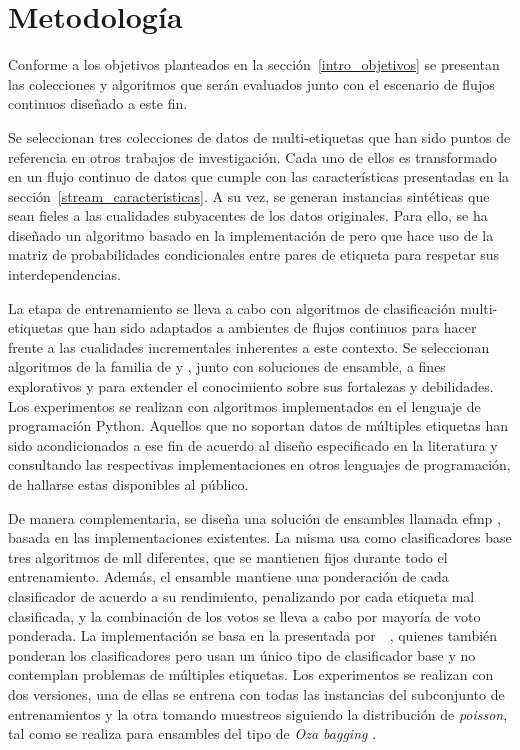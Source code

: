 \chapter{Metodología}

Conforme a los objetivos planteados en la sección~\ref{intro_objetivos} se
presentan las colecciones y algoritmos que serán evaluados junto con el
escenario de flujos continuos diseñado a este fin.

Se seleccionan tres colecciones de datos de multi-etiquetas que han sido puntos
de referencia en otros trabajos de investigación. Cada uno de ellos es
transformado en un flujo continuo de datos que cumple con las características
presentadas en la sección~\ref{stream_caracteristicas}. A su vez, se generan
instancias sintéticas que sean fieles a las cualidades subyacentes de los datos
originales.  Para ello, se ha diseñado un algoritmo basado en la implementación
de \citeauthor{read_multi-label_2008} \cite{read_multi-label_2008} pero que hace
uso de la matriz de probabilidades condicionales entre pares de etiqueta para
respetar sus interdependencias.

La etapa de entrenamiento se lleva a cabo con algoritmos de clasificación
multi-etiquetas que han sido adaptados a ambientes de flujos continuos para
hacer frente a las cualidades incrementales inherentes a este contexto. Se
seleccionan algoritmos de la familia de  y
 , junto con soluciones de ensamble, a fines explorativos
y para extender el conocimiento sobre sus fortalezas y debilidades. Los
experimentos se realizan con algoritmos implementados en el lenguaje de
programación Python.  Aquellos que no soportan datos de múltiples etiquetas han
sido acondicionados a ese fin de acuerdo al diseño especificado en la literatura
y consultando las respectivas implementaciones en otros lenguajes de
programación, de hallarse estas disponibles al público.

De manera complementaria, se diseña una solución de ensambles llamada
\acrfull{efmp} , basada en las implementaciones
existentes. La misma usa como clasificadores base tres algoritmos de
\acrshort{mll} diferentes, que se mantienen fijos durante todo el entrenamiento.
Además, el ensamble mantiene una ponderación de cada clasificador de acuerdo a
su rendimiento, penalizando por cada etiqueta mal clasificada, y la combinación
de los votos se lleva a cabo por mayoría de voto ponderada. La implementación se
basa en la presentada
por~\citeauthor{kolter_dynamic_2007}~\cite{kolter_dynamic_2007}, quienes también
ponderan los clasificadores pero usan un único tipo de clasificador base y no
contemplan problemas de múltiples etiquetas. Los experimentos se realizan con
dos versiones, una de ellas se entrena con todas las instancias del subconjunto
de entrenamientos y la otra tomando muestreos siguiendo la distribución de
\textit{poisson}, tal como se realiza para ensambles del tipo de \textit{Oza
	bagging} \cite{oza_online_2005}.

